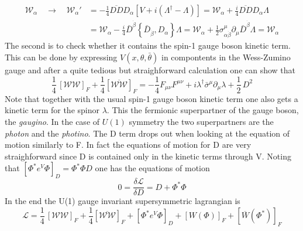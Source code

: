 \documentclass[12pt]{article}
\begin{document}
\begin{equation*}
  \begin{aligned}
      \mathcal{W}_{\alpha} \quad\to\quad \mathcal{W_\alpha}' &= -\frac{1}{4} \overline{D D} D_{\alpha}\left[V+i\left(\Lambda^{\dagger}-\Lambda\right)\right] =\mathcal{W}_{\alpha}+\frac{i}{4} \overline{D D} D_{\alpha} \Lambda \\
      &=\mathcal{W}_{\alpha}-\frac{i}{4} \bar{D}^{\dot{\beta}}\left\{\bar{D}_{\dot{\beta}}, D_{\alpha}\right\} \Lambda 
      =\mathcal{W}_{\alpha}+\frac{1}{2} \sigma_{\alpha \dot{\beta}}^{\mu} \partial_{\mu} \bar{D}^{\dot{\beta}} \Lambda
      =\mathcal{W}_{\alpha}
  \end{aligned}
\end{equation*}
The second is to check whether it contains the spin-1 gauge boson kinetic term. This can be done by expressing $V(x, \theta, \bar\theta)$ in compontents in the Wess-Zumino gauge and after a quite tedious but straighforward calculation one can show that 
\begin{equation*}
  \frac{1}{4} \, \left[\mathcal{W}\mathcal{W}\right]_F + \frac{1}{4} \left[\overline{\mathcal{W}\mathcal{W}}\right]_F = -\frac{1}{4} F_{\mu\nu}F^{\mu\nu} + i \lambda^\dagger \bar\sigma^\mu \partial_\mu \lambda + \frac{1}{2} \, D^2
\end{equation*}
Note that together with the usual spin-1 gauge boson kinetic term one also gets a kinetic term for the spinor $\lambda$. This the fermionic superpartner of the gauge boson, the \emph{gaugino}. In the case of $U(1)$ symmetry the two superpartners are the \emph{photon} and the \emph{photino}.
The D term drops out when looking at the equation of motion similarly to F. In fact the equations of motion for D are very straighforward since D is contained only in the kinetic terms through V. Noting that $[\Phi^* e^V \Phi]_D = \Phi^* \Phi D$ one has the equations of motion 
\begin{equation*}
  0 = \frac{\delta \mathcal{L}}{ \delta D} = D + \Phi^* \Phi
\end{equation*}
In the end the U(1) gauge invariant supersymmetric lagrangian is 
\begin{equation*}
  \mathcal{L} = \frac{1}{4} \, \left[\mathcal{W}\mathcal{W}\right]_F + \frac{1}{4} \left[\overline{\mathcal{W}\mathcal{W}}\right]_F + \left[\Phi^* e^V \Phi\right]_D + [W(\Phi)]_F + [\overline{W} (\Phi^*)]_F
\end{equation*}
\par
\vspace{15pt}
\end{document}
